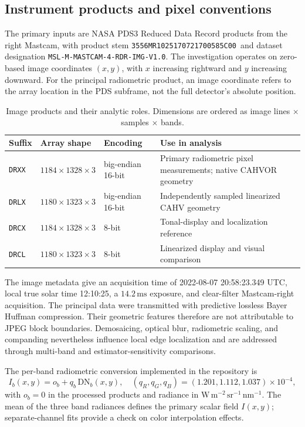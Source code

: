 \documentclass[11pt,letterpaper]{article}
\newcommand{\pdsid}{\texttt{3556MR1025170721700585C00}}
\begin{document}
\subsection{Instrument products and pixel conventions}

The primary inputs are NASA PDS3 Reduced Data Record products from the right Mastcam, with product stem \pdsid\ and dataset designation \texttt{MSL-M-MASTCAM-4-RDR-IMG-V1.0}. The investigation operates on zero-based image coordinates \((x,y)\), with \(x\) increasing rightward and \(y\) increasing downward. For the principal radiometric product, an image coordinate refers to the array location in the PDS subframe, not the full detector's absolute position.

\begin{table}[ht]
\centering\small
\caption{Image products and their analytic roles. Dimensions are ordered as image lines \(\times\) samples \(\times\) bands.}
\label{tab:products}
\begin{tabularx}{\linewidth}{@{}l l l X@{}}
\toprule
\textbf{Suffix} & \textbf{Array shape} & \textbf{Encoding} & \textbf{Use in analysis} \\
\midrule
\texttt{DRXX} & \(1184\times1328\times3\) & big-endian 16-bit & Primary radiometric pixel measurements; native CAHVOR geometry \\
\texttt{DRLX} & \(1180\times1323\times3\) & big-endian 16-bit & Independently sampled linearized CAHV geometry \\
\texttt{DRCX} & \(1184\times1328\times3\) & 8-bit & Tonal-display and localization reference \\
\texttt{DRCL} & \(1180\times1323\times3\) & 8-bit & Linearized display and visual comparison \\
\bottomrule
\end{tabularx}
\end{table}

The image metadata give an acquisition time of 2022-08-07 20:58:23.349 UTC, local true solar time 12:10:25, a \(14.2\,\mathrm{ms}\) exposure, and clear-filter Mastcam-right acquisition. The principal data were transmitted with predictive lossless Bayer Huffman compression. Their geometric features therefore are not attributable to JPEG block boundaries. Demosaicing, optical blur, radiometric scaling, and companding nevertheless influence local edge localization and are addressed through multi-band and estimator-sensitivity comparisons.

The per-band radiometric conversion implemented in the repository is
\begin{equation}
I_b(x,y)=o_b+q_b\,\mathrm{DN}_b(x,y),\quad
(q_R,q_G,q_B)=(1.201,1.112,1.037)\times10^{-4},
\label{eq:radiance}
\end{equation}
with \(o_b=0\) in the processed products and radiance in \(\mathrm{W\,m^{-2}\,sr^{-1}\,nm^{-1}}\). The mean of the three band radiances defines the primary scalar field \(I(x,y)\); separate-channel fits provide a check on color interpolation effects.
\end{document}
